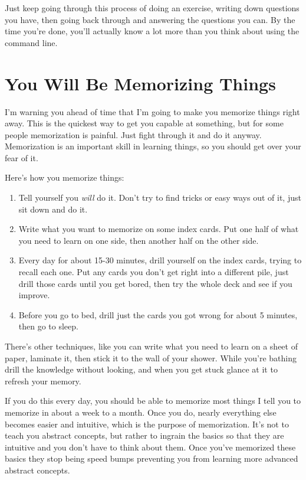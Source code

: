 Just keep going through this process of doing an exercise, writing down
questions you have, then going back through and answering the questions you
can.  By the time you're done, you'll actually know a lot more than you think
about using the command line.

\section{You Will Be Memorizing Things}

I'm warning you ahead of time that I'm going to make you memorize things right away.
This is the quickest way to get you capable at something, but for some people 
memorization is painful.  Just fight through it and do it anyway.  Memorization is an
important skill in learning things, so you should get over your fear of it.

Here's how you memorize things:

\begin{enumerate}
\item Tell yourself you \emph{will} do it.  Don't try to find tricks or easy ways out of it, just sit down and do it.
\item Write what you want to memorize on some index cards.  Put one half of what you need to learn on one side, then
    another half on the other side.
\item Every day for about 15-30 minutes, drill yourself on the index cards, trying to recall each one.  Put any cards you don't
    get right into a different pile, just drill those cards until you get bored, then try the whole deck and see
    if you improve.
\item Before you go to bed, drill just the cards you got wrong for about 5 minutes, then go to sleep.
\end{enumerate}

There's other techniques, like you can write what you need to learn on a sheet of paper, laminate it, then stick it to the
wall of your shower.  While you're bathing drill the knowledge without looking, and when you get stuck glance at it
to refresh your memory.

If you do this every day, you should be able to memorize most things I tell you to memorize in about a week to a
month.  Once you do, nearly everything else becomes easier and intuitive, which is the purpose of memorization.
It's not to teach you abstract concepts, but rather to ingrain the basics so that they are intuitive and you don't
have to think about them.  Once you've memorized these basics they stop being speed bumps preventing you from
learning more advanced abstract concepts.


